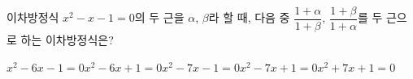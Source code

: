 이차방정식 $x^2-x-1=0$의 두 근을 $\alpha$, $\beta$라 할 때, 다음 중 $\dfrac{1+\alpha}{1+\beta}$, $\dfrac{1+\beta}{1+\alpha}$를 두 근으로 하는 이차방정식은?
\begin{choicesii}{$x^2-6x-1=0$}{$x^2-6x+1=0$}{$x^2-7x-1=0$}{$x^2-7x+1=0$}{$x^2+7x+1=0$}\end{choicesii}
